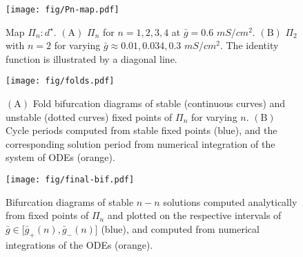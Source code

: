 \documentclass[utf8, draft]{frontiersFPHY} %
\newcommand{\gbar}{\bar g}
\begin{document}
\begin{figure}[h!]
  \centering
  \texttt{[image: fig/Pn-map.pdf]}
  \caption{Map $\Pi_{n}:d^{\star}$. $\bm{\mathrm{(A)}}$ $\Pi_{n}$ for $n=1,2,3,4$
  at $\gbar=0.6$ $\si{mS/cm^{2}}$. $\bm{\mathrm{(B)}}$ $\Pi_{2}$ with $n=2$ for
  varying $\gbar \approx 0.01, 0.034, 0.3$ $\si{mS/cm^{2}}$. The identity function is
  illustrated by a diagonal line.~\label{fig:Pn-map}}
\end{figure}

\begin{figure}[h!]
  \centering
  \texttt{[image: fig/folds.pdf]}
  \caption{$\bm{\mathrm{(A)}}$ Fold bifurcation diagrams of stable (continuous curves)
    and unstable (dotted curves) fixed points of $\Pi_{n}$ for varying $n$.
    $\bm{\mathrm{(B)}}$ Cycle periods computed from stable fixed points (blue), and the
    corresponding solution period from numerical integration of the system of ODEs
    (orange).~\label{fig:folds}}
\end{figure}

\begin{figure}[h!]
  \centering
  \texttt{[image: fig/final-bif.pdf]}
  \caption{Bifurcation diagrams of stable $n-n$ solutions computed analytically from
    fixed points of $\Pi_n$ and plotted on the respective intervals of $\gbar\in
    \big[\gbar_+(n),\gbar_-(n)\big]$ (blue), and computed from numerical integrations of
    the ODEs (orange).~\label{fig:final-bif}}
\end{figure}
\end{document}
